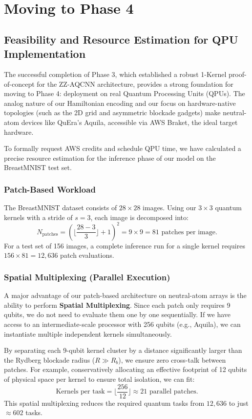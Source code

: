 \documentclass{oqireport}
\begin{document}
\section{Moving to Phase 4}
\subsection{Feasibility and Resource Estimation for QPU Implementation}
The successful completion of Phase 3, which established a robust 1-Kernel proof-of-concept for the ZZ-AQCNN architecture, provides a strong foundation for moving to Phase 4: deployment on real Quantum Processing Units (QPUs). The analog nature of our Hamiltonian encoding and our focus on hardware-native topologies (such as the 2D grid and asymmetric blockade gadgets) make neutral-atom devices like QuEra's Aquila, accessible via AWS Braket, the ideal target hardware.

To formally request AWS credits and schedule QPU time, we have calculated a precise resource estimation for the inference phase of our model on the BreastMNIST test set.

\subsubsection{Patch-Based Workload}
The BreastMNIST dataset consists of $28 \times 28$ images. Using our $3 \times 3$ quantum kernels with a stride of $s=3$, each image is decomposed into:
\begin{equation}
    N_{\text{patches}} = \left( \lfloor \frac{28 - 3}{3} \rfloor + 1 \right)^2 = 9 \times 9 = 81 \text{ patches per image.}
\end{equation}
For a test set of 156 images, a complete inference run for a single kernel requires $156 \times 81 = 12,636$ patch evaluations.

\subsubsection{Spatial Multiplexing (Parallel Execution)}
A major advantage of our patch-based architecture on neutral-atom arrays is the ability to perform \textbf{Spatial Multiplexing}. Since each patch only requires 9 qubits, we do not need to evaluate them one by one sequentially. If we have access to an intermediate-scale processor with 256 qubits (e.g., Aquila), we can instantiate multiple independent kernels simultaneously. 

By separating each 9-qubit kernel cluster by a distance significantly larger than the Rydberg blockade radius ($R \gg R_b$), we ensure zero cross-talk between patches. For example, conservatively allocating an effective footprint of 12 qubits of physical space per kernel to ensure total isolation, we can fit:
\begin{equation}
    \text{Kernels per task} = \lfloor \frac{256}{12} \rfloor \approx 21 \text{ parallel patches.}
\end{equation}
This spatial multiplexing reduces the required quantum tasks from $12,636$ to just $\approx 602$ tasks.
\end{document}
